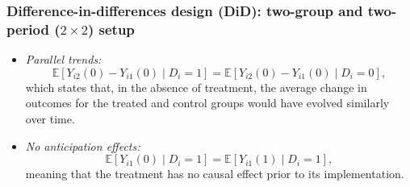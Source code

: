 \documentclass[12pt, compress]{beamer}
\begin{document}
\begin{frame}
	\frametitle{Difference-in-differences design (DiD): two-group and two-period ($2\times2$) setup}
    \begin{itemize}
        \item \textit{Parallel trends:}
\begin{equation*}
	\mathbb{E}[Y_{i2}(0) - Y_{i1}(0) \mid D_i = 1] = \mathbb{E}[Y_{i2}(0) - Y_{i1}(0) \mid D_i = 0],
\end{equation*}
which states that, in the absence of treatment, the average change in outcomes for the treated and control groups would have evolved similarly over time.

\item \textit{No anticipation effects:}
\begin{equation*}
	\mathbb{E}[Y_{i1}(0)\mid D_i=1] = \mathbb{E}[Y_{i1}(1)\mid D_i=1],
\end{equation*}
meaning that the treatment has no causal effect prior to its implementation.
    \end{itemize}
\end{frame}
\end{document}
